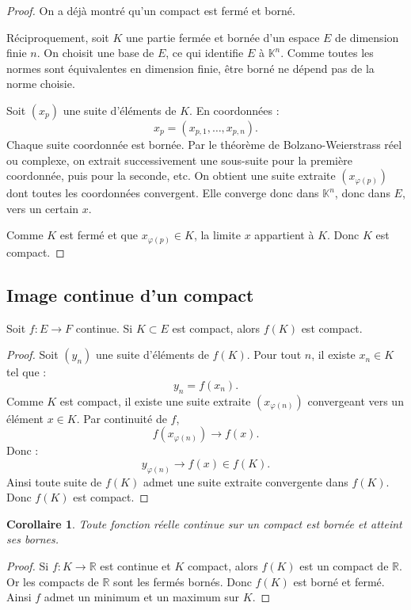 \documentclass[11pt,a4paper]{article}
\newtheorem{corollaire}[prop]{Corollaire}
\newcommand{\K}{\mathbb K}
\newcommand{\R}{\mathbb R}
\begin{document}
\begin{proof}
On a déjà montré qu'un compact est fermé et borné.

Réciproquement, soit \(K\) une partie fermée et bornée d'un espace \(E\) de dimension finie \(n\).  
On choisit une base de \(E\), ce qui identifie \(E\) à \(\K^n\).  
Comme toutes les normes sont équivalentes en dimension finie, être borné ne dépend pas de la norme choisie.

Soit \((x_p)\) une suite d'éléments de \(K\).  
En coordonnées :
\[
x_p=(x_{p,1},\dots,x_{p,n}).
\]
Chaque suite coordonnée est bornée. Par le théorème de Bolzano-Weierstrass réel ou complexe, on extrait successivement une sous-suite pour la première coordonnée, puis pour la seconde, etc. On obtient une suite extraite \((x_{\varphi(p)})\) dont toutes les coordonnées convergent.  
Elle converge donc dans \(\K^n\), donc dans \(E\), vers un certain \(x\).

Comme \(K\) est fermé et que \(x_{\varphi(p)}\in K\), la limite \(x\) appartient à \(K\).  
Donc \(K\) est compact.
\end{proof}

\subsection{Image continue d'un compact}

\begin{theorembox}
Soit \(f:E\to F\) continue.  
Si \(K\subset E\) est compact, alors \(f(K)\) est compact.
\end{theorembox}

\begin{proof}
Soit \((y_n)\) une suite d'éléments de \(f(K)\).  
Pour tout \(n\), il existe \(x_n\in K\) tel que :
\[
y_n=f(x_n).
\]
Comme \(K\) est compact, il existe une suite extraite \((x_{\varphi(n)})\) convergeant vers un élément \(x\in K\).  
Par continuité de \(f\),
\[
f(x_{\varphi(n)})\to f(x).
\]
Donc :
\[
y_{\varphi(n)}\to f(x)\in f(K).
\]
Ainsi toute suite de \(f(K)\) admet une suite extraite convergente dans \(f(K)\).  
Donc \(f(K)\) est compact.
\end{proof}

\begin{corollaire}
Toute fonction réelle continue sur un compact est bornée et atteint ses bornes.
\end{corollaire}

\begin{proof}
Si \(f:K\to\R\) est continue et \(K\) compact, alors \(f(K)\) est un compact de \(\R\).  
Or les compacts de \(\R\) sont les fermés bornés.  
Donc \(f(K)\) est borné et fermé.  
Ainsi \(f\) admet un minimum et un maximum sur \(K\).
\end{proof}
\end{document}
